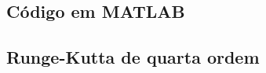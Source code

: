 \documentclass[10pt,a4paper]{article}
\begin{document}
    \newpage
    \subsection{Código em MATLAB}
    
    \subsection{Runge-Kutta de quarta ordem}
    
    
\end{document}
